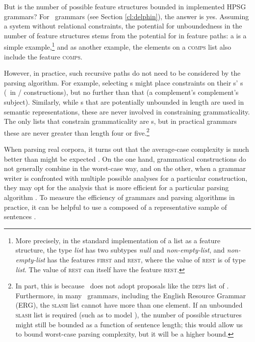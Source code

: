 \documentclass[output=paper
                ,modfonts
                ,nonflat
	        ,collection
	        ,collectionchapter
	        ,collectiontoclongg
 	        ,biblatex
                ,babelshorthands
                ,newtxmath
                ,draftmode
                ,colorlinks, citecolor=brown
]{./langsci/langscibook}
\begin{document}
But is the number of possible feature structures bounded
in implemented HPSG grammars?
For \delphin\ grammars (see Section \ref{cl:delphin}),
the answer is yes.
Assuming a system without relational constraints,
the potential for unboundedness in the number of feature structures
stems from the potential for  in feature paths:
a  is a simple example,\footnote{%
	More precisely, in the standard implementation of a list as a feature structure,
	the type \textit{list} has two subtypes \textit{null} and \textit{non-empty-list}, and
	\textit{non-empty-list} has the features \textsc{first}
	and \textsc{rest}, where the value of \textsc{rest} is of type \textit{list}.
	The value of \textsc{rest} can itself have the feature \textsc{rest}.
}
and as another example, the elements on a \textsc{comps} list
also include the feature \textsc{comps}.

However, in practice, such recursive paths do not need to be considered by the parsing algorithm.
For example, selecting s might place constraints on their s' s
(\eg\ in / constructions),
but no further than that (\eg a complement's complement's subject).
Similarly, while s that are potentially unbounded in length are used in semantic representations,
these are never involved in constraining grammaticality.
The only lists that constrain grammaticality are s,
but in practical grammars these are never greater than length four or five.\footnote{%
	In part, this is because \delphin\ does not
	adopt proposals like the \textsc{deps} list of \citet*{BMS2001a-unlinked}.
	Furthermore, in many \delphin\ grammars, including the English Resource Grammar (ERG),
	the \textsc{slash} list cannot have more than one element.
	If an unbounded \textsc{slash} list is required
	(such as to model ),
	the number of possible structures might still be bounded as a function of sentence length;
	this would allow us to bound worst-case parsing complexity,
	but it will be a higher bound.
}

When parsing real corpora,
it turns out that the average-case complexity is much better than might be expected \citep{Carroll94}.
On the one hand, grammatical constructions do not generally combine in the worst-case way,
and on the other, when a grammar writer is confronted
with multiple possible analyses for a particular construction,
they may opt for the analysis that is more efficient for a particular parsing algorithm \citep{Flickinger2000a}.
To measure the efficiency of grammars and parsing algorithms in practice,
it can be helpful to use a  composed of a representative sample of sentences \citep{OF98}.
\end{document}
